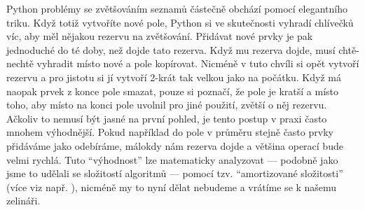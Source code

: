 \begin{center}
\begin{minipage}{5cm}
\end{minipage}
\end{center}


Python problémy se zvětšováním seznamů částečně obchází pomocí elegantního triku. Když totiž vytvoříte nové pole, Python si ve skutečnosti vyhradí chlívečků víc,
aby měl nějakou rezervu na zvětšování. Přidávat nové prvky je pak jednoduché do té doby, než dojde tato rezerva. Když mu rezerva dojde, musí chtě-nechtě
vyhradit místo nové a pole kopírovat. Nicméně v tuto chvíli si opět vytvoří rezervu a pro jistotu si jí vytvoří 2-krát tak velkou jako na počátku.
Když má naopak prvek z konce pole smazat, pouze si poznačí, že pole je kratší a místo toho, aby místo na konci pole uvolnil pro jiné použití,
zvětší o něj rezervu. Ačkoliv to nemusí být jasné na první pohled, je tento postup v praxi často mnohem výhodnější. Pokud například do pole v průměru stejně
často prvky přidáváme jako odebíráme, málokdy nám rezerva dojde a většina operací bude velmi rychlá. Tuto ``výhodnost'' lze matematicky analyzovat ---
podobně jako jsme to udělali se složitostí algoritmů --- pomocí tzv. ``amortizované složitosti'' (více viz např. \cite{Tarjan:1985}), nicméně my to nyní
dělat nebudeme a vrátíme se k našemu zelináři.


